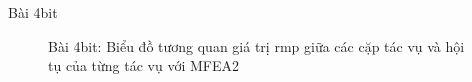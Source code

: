     \begin{frame}{Bài 4bit}
        \begin{figure}[H]
            \centering
            \caption{Bài 4bit: Biểu đồ tương quan giá trị rmp giữa các cặp tác vụ và hội tụ của từng tác vụ với MFEA2}
            \label{fig:my_label}
        \end{figure}
    \end{frame}

